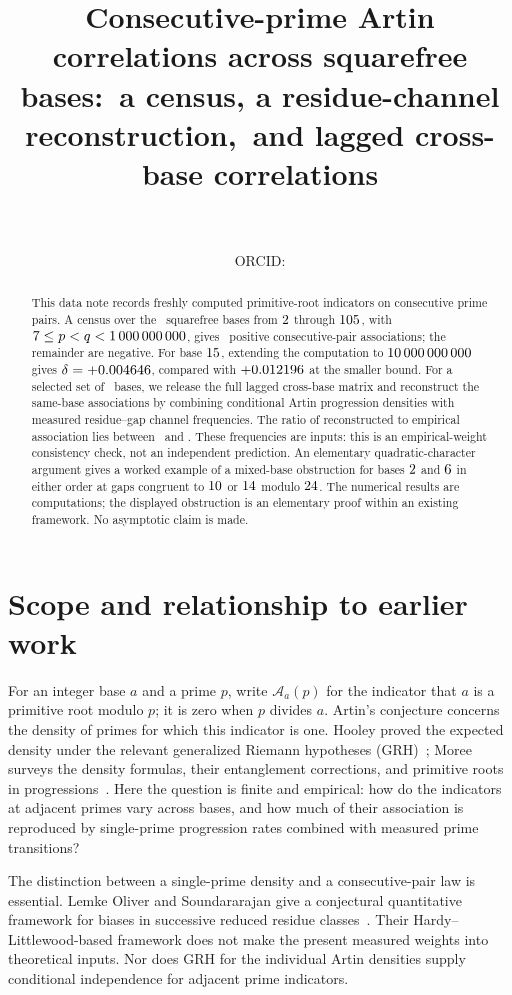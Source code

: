 \documentclass[11pt]{article}
\title{Consecutive-prime Artin correlations across squarefree bases:\ a census, a residue-channel reconstruction,\ and lagged cross-base correlations}
\author{\AuthorName\\\Affiliation\\\small ORCID: \AuthorOrcid}
\date{}
\newcommand{\A}{\mathcal A}
\begin{document}
\maketitle
\begin{abstract}
This data note records freshly computed primitive-root indicators on consecutive
prime pairs. A census over the \BaseCount\ squarefree bases from $2$ through
$105$, with $7\le p<q<1\,000\,000\,000$, gives
\PositiveCount\ positive consecutive-pair associations; the remainder are negative.
For base $15$, extending the computation to $10\,000\,000\,000$ gives
$\delta=+0.004646$, compared with $+0.012196$ at the smaller bound.
For a selected set of \SelectedCount\ bases, we release the full lagged cross-base
matrix and reconstruct the same-base associations by combining conditional Artin
progression densities with measured residue--gap channel frequencies. The ratio of
reconstructed to empirical association lies between \RatioMinimum\ and
\RatioMaximum. These frequencies are inputs: this is an empirical-weight
consistency check, not an independent prediction. An elementary quadratic-character
argument gives a worked example of a mixed-base obstruction for bases $2$ and $6$ in either
order at gaps congruent to $10$ or $14$ modulo $24$.
The numerical results are computations; the displayed obstruction is an elementary
proof within an existing framework. No asymptotic claim is made.
\end{abstract}

\section{Scope and relationship to earlier work}
For an integer base $a$ and a prime $p$, write $\A_a(p)$ for the indicator that
$a$ is a primitive root modulo $p$; it is zero when $p$ divides $a$.
Artin's conjecture concerns the density of primes for which this indicator is one.
Hooley proved the expected density under the relevant generalized Riemann
hypotheses (GRH)~\cite{hooley}; Moree surveys the density formulas, their
entanglement corrections, and primitive roots in progressions~\cite{moree}.
Here the question is finite and empirical: how do the indicators at adjacent
primes vary across bases, and how much of their association is reproduced by
single-prime progression rates combined with measured prime transitions?

The distinction between a single-prime density and a consecutive-pair law is
essential. Lemke Oliver and Soundararajan give a conjectural quantitative
framework for biases in successive reduced residue classes~\cite{los}.
Their Hardy--Littlewood-based framework does not make the present measured
weights into theoretical inputs. Nor does GRH for the individual Artin densities
supply conditional independence for adjacent prime indicators.
\end{document}

